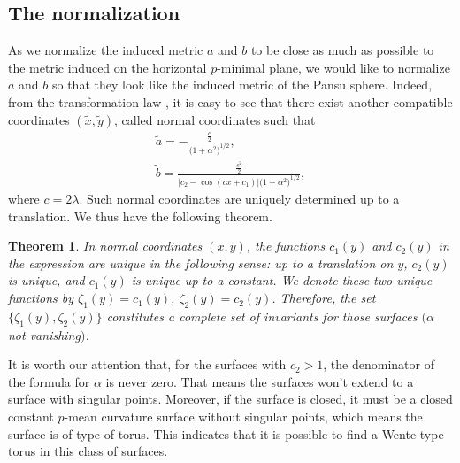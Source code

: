 \documentclass[pdftex]{sigma}
\numberwithin{equation}{section}
\newtheorem{Theorem}{Theorem}[section]
\begin{document}
\subsection{The normalization} As we normalize the induced metric $a$ and $b$ to be close as much as possible to the metric induced on the horizontal $p$-minimal plane, we would like to normalize $a$ and $b$ so that they look like the induced
metric of the Pansu sphere. Indeed, from the transformation law \cite[formula~(2.20)]{ChiuH/LiuH:2022}, it is easy to see that there exist
another compatible coordinates $(\tilde{x},\tilde{y})$, called
normal coordinates such that
\begin{gather}
\tilde{a}=-\frac{\frac{c}{2}}{\bigl(1+\alpha^{2}\bigr)^{1/2}}, \label{nora}
\\
\tilde{b}=\frac{\frac{c^2}{2}}{|c_{2}-\cos{(cx+c_{1})}|\bigl(1+\alpha^{2}\bigr)^{1/2}}, \label{norb}
\end{gather}
where $c=2\lambda$. Such normal coordinates are uniquely determined up to a translation. We thus have the following theorem.

\begin{Theorem}
\label{cominv} In normal coordinates $(x,y)$, the functions $c_{1}(y)$ and $
c_{2}(y)$ in the expression  are unique in the following sense: up to a
translation on $y$, $c_{2}(y)$ is unique, and $c_{1}(y)$ is unique up to a
constant. We denote these two unique functions by
$
\zeta_{1}(y)=c_{1}(y)$, $ \zeta_{2}(y)=c_{2}(y)$.
Therefore, the set $\{\zeta_{1}(y), \zeta_{2}(y)\}$ constitutes a \emph{complete} set of
invariants for those surfaces $(\alpha$ not vanishing$)$.
\end{Theorem}

It is worth our attention that, for the surfaces with $c_{2}>1$, the
denominator of the formula for $\alpha$ is never zero. That means the
surfaces won't extend to a surface with singular points. Moreover, if the
surface is closed, it must be a closed constant $p$-mean curvature
surface without singular points, which means the surface is of type of
torus. This indicates that it is possible to find a Wente-type torus in this
class of surfaces.
\end{document}
